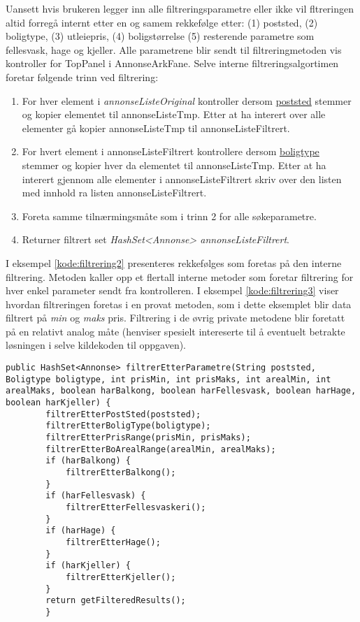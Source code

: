 Uansett hvis brukeren legger inn alle filtreringsparametre eller ikke vil fltreringen altid forregå internt etter en og samem rekkefølge etter: (1) poststed, (2) boligtype, (3) utleiepris, (4) boligstørrelse (5) resterende parametre som fellesvask, hage og kjeller. Alle parametrene blir sendt til filtreringmetoden vis kontroller for TopPanel i AnnonseArkFane. Selve interne filtreringsalgortimen foretar følgende trinn ved filtrering:
\begin{enumerate}
\item For hver element i \emph{annonseListeOriginal} kontroller dersom \underline{poststed} stemmer og kopier elementet til annonseListeTmp. Etter at ha interert over alle elementer gå kopier annonseListeTmp til annonseListeFiltrert. 
\item For hvert element i annonseListeFiltrert kontrollere dersom \underline{boligtype} stemmer og kopier hver da elementet til annonseListeTmp. Etter at ha interert gjennom alle elementer i annonseListeFiltrert skriv over den listen med innhold ra listen annonseListeFiltrert. 
\item Foreta samme tilnærmingsmåte som i trinn 2 for alle søkeparametre. 
\item Returner filtrert set \emph{HashSet<Annonse> annonseListeFiltrert}.
\end{enumerate}

I eksempel \ref{kode:filtrering2} presenteres rekkefølges som foretas på den interne filtrering. Metoden kaller opp et flertall interne metoder som foretar filtrering for hver enkel parameter sendt fra kontrolleren. I eksempel \ref{kode:filtrering3} viser hvordan filtreringen foretas i en provat metoden, som i dette eksemplet blir data filtrert på \textit{min} og \textit{maks} pris. Filtrering i de øvrig private metodene blir foretatt på en relativt analog måte (henviser spesielt intereserte til å eventuelt betrakte løsningen i selve kildekoden til oppgaven). 

\begin{lstlisting}[caption=AnnonseFilter.java: Filtreringsrekkefølge etter mottatte parametre, label=kode:filtrering2]
	public HashSet<Annonse> filtrerEtterParametre(String poststed, Boligtype boligtype, int prisMin, int prisMaks, int arealMin, int arealMaks, boolean harBalkong, boolean harFellesvask, boolean harHage, boolean harKjeller) {
        filtrerEtterPostSted(poststed);
        filtrerEtterBoligType(boligtype);
        filtrerEtterPrisRange(prisMin, prisMaks);
        filtrerEtterBoArealRange(arealMin, arealMaks);
        if (harBalkong) {
            filtrerEtterBalkong();
        }
        if (harFellesvask) {
            filtrerEtterFellesvaskeri();
        }
        if (harHage) {
            filtrerEtterHage();
        }
        if (harKjeller) {
            filtrerEtterKjeller();
        }
        return getFilteredResults();
    	}
\end{lstlisting}
    
